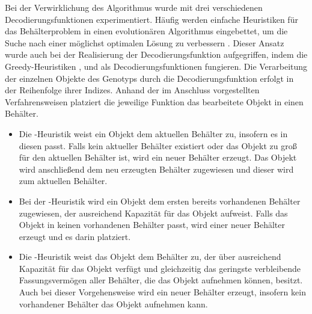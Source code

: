     Bei der Verwirklichung des Algorithmus wurde mit drei verschiedenen Decodierungsfunktionen experimentiert. Häufig werden einfache Heuristiken für das Behälterproblem in einen evolutionären Algorithmus eingebettet, um die Suche nach einer möglichst optimalen Lösung zu verbessern \parencite[64]{MitsuCheng:1999}. Dieser Ansatz wurde auch bei der Realisierung der Decodierungsfunktion aufgegriffen, indem die Greedy-Heuristiken \nextfit, \firstfit und \bestfit als Decodierungsfunktionen fungieren. Die Verarbeitung der einzelnen Objekte des Genotyps durch die Decodierungsfunktion erfolgt in der Reihenfolge ihrer Indizes. Anhand der im Anschluss vorgestellten Verfahrensweisen platziert die jeweilige Funktion das bearbeitete Objekt in einen Behälter.
    \begin{itemize}
    \item Die \textbf{\nextfit}-Heuristik weist ein Objekt dem aktuellen Behälter zu, insofern es in diesen passt. Falls kein aktueller Behälter existiert oder das Objekt zu groß für den aktuellen Behälter ist, wird ein neuer Behälter erzeugt. Das Objekt wird anschließend dem neu erzeugten Behälter zugewiesen und dieser wird zum aktuellen Behälter. 
    \item Bei der \textbf{\firstfit}-Heuristik wird ein Objekt dem ersten bereits vorhandenen Behälter zugewiesen, der ausreichend Kapazität für das Objekt aufweist. Falls das Objekt in keinen vorhandenen Behälter passt, wird einer neuer Behälter erzeugt und es darin platziert.
    \item Die \textbf{\bestfit}-Heuristik weist das Objekt dem Behälter zu, der über ausreichend Kapazität für das Objekt verfügt und gleichzeitig das geringste verbleibende Fassungsvermögen aller Behälter, die das Objekt aufnehmen können, besitzt. Auch bei dieser Vorgehensweise wird ein neuer Behälter erzeugt, insofern kein vorhandener Behälter das Objekt aufnehmen kann. 
    \end{itemize}


